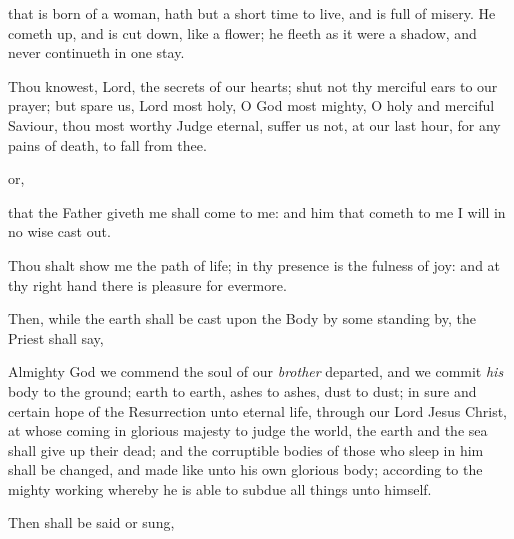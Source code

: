  that is born of a woman, hath but a short time to live, and is full of misery. He cometh up, and is cut down, like a flower; he fleeth as it were a shadow, and never continueth in one stay.\par
{}
    Thou knowest, Lord, the secrets of our hearts; shut not thy merciful ears to our prayer; but spare us, Lord most holy, O God most mighty, O holy and merciful Saviour, thou most worthy Judge eternal, suffer us not, at our last hour, for any pains of death, to fall from thee.
\begin{inhead}
    or,
\end{inhead}
 that the Father giveth me shall come to me: and him that cometh to me I will in no wise cast out.\par
    Thou shalt show me the path of life; in thy presence is the fulness of joy: and at thy right hand there is pleasure for evermore.

\begin{rubric}
    Then, while the earth shall be cast upon the Body by some standing by, the Priest shall say,
\end{rubric}

 Almighty God we commend the soul of our \textit{brother} departed, and we commit \textit{his} body to the ground; earth to earth, ashes to ashes, dust to dust; in sure and certain hope of the Resurrection unto eternal life, through our Lord Jesus Christ, at whose coming in glorious majesty to judge the world, the earth and the sea shall give up their dead; and the corruptible bodies of those who sleep in him shall be changed, and made like unto his own glorious body; according to the mighty working whereby he is able to subdue all things unto himself.

\begin{rubric}
    Then shall be said or sung,
\end{rubric}\par\noindent
{}

